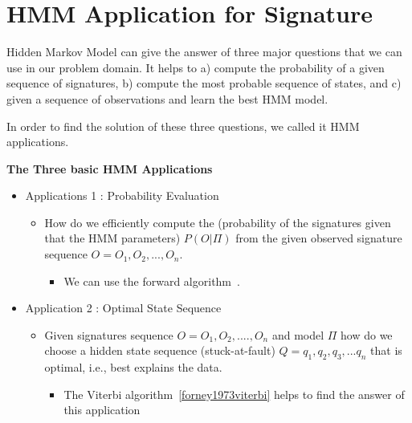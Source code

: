 \section{HMM Application for Signature}

Hidden Markov Model can give the answer of three major questions that we can use in our problem domain. It helps to a) compute the probability of a given sequence of signatures, b) compute the most probable sequence of states, and c) given a sequence of observations and learn the best HMM model.

In order to find the solution of these three questions, we called it HMM applications.


\textbf{The Three basic HMM Applications}

\begin{itemize}
\item Applications 1 : Probability Evaluation
 \begin{itemize}
 \item How do we efficiently compute the (probability of the signatures given that the HMM parameters) $P(O|\Pi)$ from the given observed signature sequence $O = {O_1, O_2,...,O_n}$.
 
  \begin{itemize}
  \item We can use the forward algorithm~\cite{ghahramani1996factorial}.
  \end{itemize}
 \end{itemize}
\end{itemize}

\begin{itemize}
\item Application 2 : Optimal State Sequence
 \begin{itemize}
 \item Given signatures sequence $O = {O_1, O_2,....,}O_n$ and model $\Pi$ how do we choose a hidden state sequence (stuck-at-fault) $Q={q_1,q_2,q_3,...q_n}$
that is optimal, i.e., best explains the data. 
  \begin{itemize}
  \item The Viterbi algorithm~\ref{forney1973viterbi} helps to find the answer of this application
  \end{itemize}
 \end{itemize}
\end{itemize}



